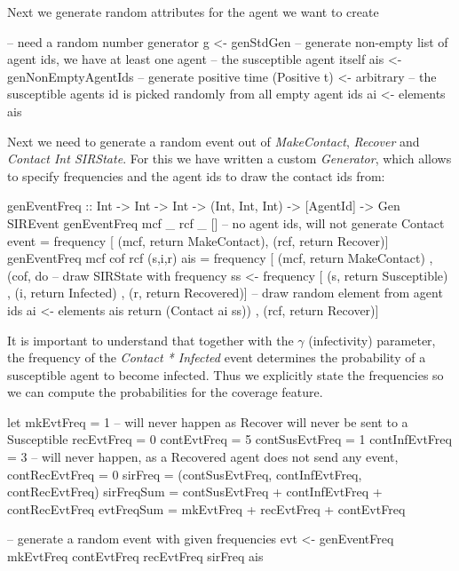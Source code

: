 Next we generate random attributes for the agent we want to create

\begin{HaskellCode}
-- need a random number generator
g <- genStdGen
-- generate non-empty list of agent ids, we have at least one agent
-- the susceptible agent itself
ais <- genNonEmptyAgentIds
-- generate positive time
(Positive t) <- arbitrary
-- the susceptible agents id is picked randomly from all empty agent ids
ai <- elements ais 
\end{HaskellCode}

Next we need to generate a random event out of \textit{MakeContact}, \textit{Recover} and \textit{Contact Int SIRState}. For this we have written a custom \textit{Generator}, which allows to specify frequencies and the agent ids to draw the contact ids from:

\begin{HaskellCode}
genEventFreq :: Int -> Int -> Int -> (Int, Int, Int) -> [AgentId] -> Gen SIREvent
genEventFreq mcf _ rcf _ []  
  -- no agent ids, will not generate Contact event
  = frequency [ (mcf, return MakeContact), (rcf, return Recover)]
genEventFreq mcf cof rcf (s,i,r) ais
  = frequency [ (mcf, return MakeContact)
              , (cof, do
                  -- draw SIRState with frequency 
                  ss <- frequency [ (s, return Susceptible)
                                  , (i, return Infected)
                                  , (r, return Recovered)]
                  -- draw random element from agent ids
                  ai <- elements ais
                  return (Contact ai ss))
              , (rcf, return Recover)]
\end{HaskellCode}

It is important to understand that together with the $\gamma$ (infectivity) parameter, the frequency of the \textit{Contact * Infected} event determines the probability of a susceptible agent to become infected. Thus we explicitly state the frequencies so we can compute the probabilities for the coverage feature.

\begin{HaskellCode}
let mkEvtFreq = 1
    -- will never happen as Recover will never be sent to a Susceptible
    recEvtFreq = 0
    contEvtFreq = 5
    contSusEvtFreq = 1
    contInfEvtFreq = 3
    -- will never happen, as a Recovered agent does not send any event,
    contRecEvtFreq = 0
    sirFreq    = (contSusEvtFreq, contInfEvtFreq, contRecEvtFreq)
    sirFreqSum = contSusEvtFreq + contInfEvtFreq + contRecEvtFreq
    evtFreqSum = mkEvtFreq + recEvtFreq + contEvtFreq
    
-- generate a random event with given frequencies
evt <- genEventFreq mkEvtFreq contEvtFreq recEvtFreq sirFreq ais
\end{HaskellCode}

